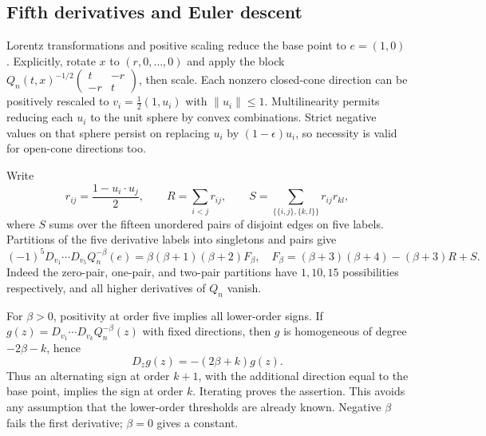 \documentclass[11pt,a4paper]{article}
\theoremstyle{definition}\newtheorem{definition}[theorem]{Definition}
\theoremstyle{remark}\newtheorem{remark}[theorem]{Remark}
\numberwithin{equation}{section}
\begin{document}
\subsection{Fifth derivatives and Euler descent}\label{S09-sec-2}
Lorentz transformations and positive scaling reduce the base point to $e=(1,0)$. Explicitly, rotate $x$ to $(r,0,\ldots,0)$ and apply the block
$Q_n(t,x)^{-1/2}\left(\begin{smallmatrix}t&-r\\-r&t\end{smallmatrix}\right)$, then scale. Each nonzero closed-cone direction can be positively rescaled to $v_i=\tfrac12(1,u_i)$ with $\|u_i\|\le1$. Multilinearity permits reducing each $u_i$ to the unit sphere by convex combinations. Strict negative values on that sphere persist on replacing $u_i$ by $(1-\epsilon)u_i$, so necessity is valid for open-cone directions too.

Write
\[
 r_{ij}=\frac{1-u_i\cdot u_j}{2},\qquad
 R=\sum_{i<j}r_{ij},\qquad
 S=\sum_{\{\{i,j\},\{k,l\}\}}r_{ij}r_{kl},
\]
where $S$ sums over the fifteen unordered pairs of disjoint edges on five labels. Partitions of the five derivative labels into singletons and pairs give
\begin{equation}\label{S09-der}
 (-1)^5D_{v_1}\cdots D_{v_5}Q_n^{-\beta}(e)
 =\beta(\beta+1)(\beta+2)F_\beta,
 \quad F_\beta=(\beta+3)(\beta+4)-(\beta+3)R+S.
\end{equation}
Indeed the zero-pair, one-pair, and two-pair partitions have $1,10,15$ possibilities respectively, and all higher derivatives of $Q_n$ vanish.

For $\beta>0$, positivity at order five implies all lower-order signs. If $g(z)=D_{v_1}\cdots D_{v_k}Q_n^{-\beta}(z)$ with fixed directions, then $g$ is homogeneous of degree $-2\beta-k$, hence
\[
 D_zg(z)=-(2\beta+k)g(z).
\]
Thus an alternating sign at order $k+1$, with the additional direction equal to the base point, implies the sign at order $k$. Iterating proves the assertion. This avoids any assumption that the lower-order thresholds are already known. Negative $\beta$ fails the first derivative; $\beta=0$ gives a constant.
\end{document}
